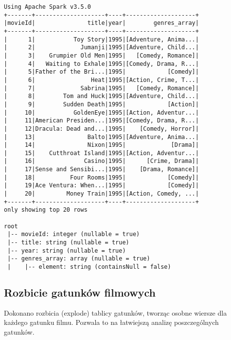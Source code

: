 \documentclass{article}
\begin{document}
\begin{verbatim}
Using Apache Spark v3.5.0
+-------+--------------------+----+--------------------+
|movieId|               title|year|        genres_array|
+-------+--------------------+----+--------------------+
|      1|           Toy Story|1995|[Adventure, Anima...|
|      2|             Jumanji|1995|[Adventure, Child...|
|      3|    Grumpier Old Men|1995|   [Comedy, Romance]|
|      4|   Waiting to Exhale|1995|[Comedy, Drama, R...|
|      5|Father of the Bri...|1995|            [Comedy]|
|      6|                Heat|1995|[Action, Crime, T...|
|      7|             Sabrina|1995|   [Comedy, Romance]|
|      8|        Tom and Huck|1995|[Adventure, Child...|
|      9|        Sudden Death|1995|            [Action]|
|     10|           GoldenEye|1995|[Action, Adventur...|
|     11|American Presiden...|1995|[Comedy, Drama, R...|
|     12|Dracula: Dead and...|1995|    [Comedy, Horror]|
|     13|               Balto|1995|[Adventure, Anima...|
|     14|               Nixon|1995|             [Drama]|
|     15|    Cutthroat Island|1995|[Action, Adventur...|
|     16|              Casino|1995|      [Crime, Drama]|
|     17|Sense and Sensibi...|1995|    [Drama, Romance]|
|     18|          Four Rooms|1995|            [Comedy]|
|     19|Ace Ventura: When...|1995|            [Comedy]|
|     20|         Money Train|1995|[Action, Comedy, ...|
+-------+--------------------+----+--------------------+
only showing top 20 rows

root
 |-- movieId: integer (nullable = true)
 |-- title: string (nullable = true)
 |-- year: string (nullable = true)
 |-- genres_array: array (nullable = true)
 |    |-- element: string (containsNull = false)
\end{verbatim}

\subsection{Rozbicie gatunków filmowych}
Dokonano rozbicia (explode) tablicy gatunków, tworząc osobne wiersze dla każdego gatunku filmu. Pozwala to na łatwiejszą analizę poszczególnych gatunków.
\end{document}
